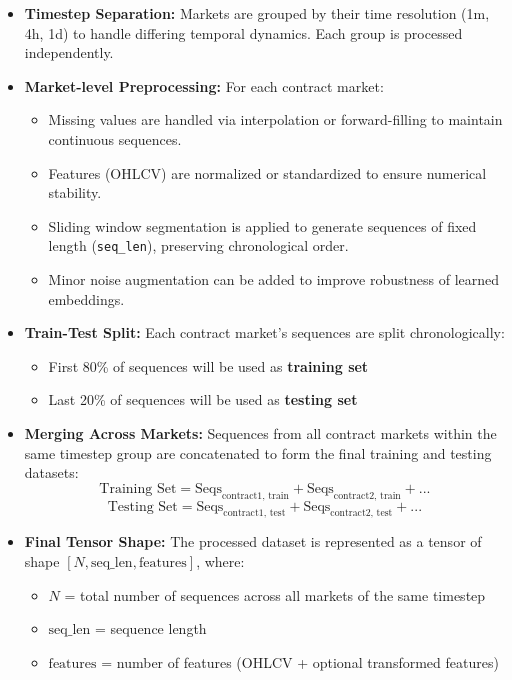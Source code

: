 \begin{itemize}[noitemsep]
    \item \textbf{Timestep Separation:}  
    Markets are grouped by their time resolution (1m, 4h, 1d) to handle differing temporal dynamics. Each group is processed independently.
    
    \item \textbf{Market-level Preprocessing:}  
    For each contract market:
    \begin{itemize}[noitemsep]
        \item Missing values are handled via interpolation or forward-filling to maintain continuous sequences.
        \item Features (OHLCV) are normalized or standardized to ensure numerical stability.
        \item Sliding window segmentation is applied to generate sequences of fixed length (\texttt{seq\_len}), preserving chronological order.
        \item Minor noise augmentation can be added to improve robustness of learned embeddings.
    \end{itemize}

    \item \textbf{Train-Test Split:}  
    Each contract market's sequences are split chronologically:
    \begin{itemize}[noitemsep]
        \item First 80\% of sequences will be used as \textbf{training set}
        \item Last 20\% of sequences will be used as \textbf{testing set}
    \end{itemize}

    \item \textbf{Merging Across Markets:}  
    Sequences from all contract markets within the same timestep group are concatenated to form the final training and testing datasets:
    \[
        \text{Training Set} = \text{Seqs}_{\text{contract1, train}} + \text{Seqs}_{\text{contract2, train}} + ... 
    \]
    \[
        \text{Testing Set} = \text{Seqs}_{\text{contract1, test}} + \text{Seqs}_{\text{contract2, test}} + ...
    \]

    
    \item \textbf{Final Tensor Shape:}  
    The processed dataset is represented as a tensor of shape $[N, \text{seq\_len}, \text{features}]$, where:
    \begin{itemize}[noitemsep]
        \item $N$ = total number of sequences across all markets of the same timestep
        \item $\text{seq\_len}$ = sequence length
        \item $\text{features}$ = number of features (OHLCV + optional transformed features)
    \end{itemize}
\end{itemize}

